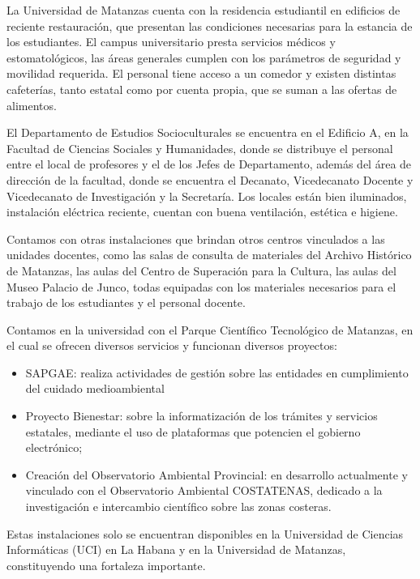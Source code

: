 La Universidad de Matanzas cuenta con la residencia estudiantil en edificios de reciente restauración, que presentan las condiciones necesarias para la estancia de los estudiantes. El campus universitario presta servicios médicos y estomatológicos, las áreas generales cumplen con los parámetros de seguridad y movilidad requerida. El personal tiene acceso a un comedor y existen distintas cafeterías, tanto estatal como por cuenta propia, que se suman a las ofertas de alimentos.

El Departamento de Estudios Socioculturales se encuentra en el Edificio A, en la Facultad de Ciencias Sociales y Humanidades, donde se distribuye el personal entre el local de profesores y el de los Jefes de Departamento, además del área de dirección de la facultad, donde se encuentra el Decanato, Vicedecanato Docente y Vicedecanato de Investigación y la Secretaría. Los locales están bien iluminados, instalación eléctrica reciente, cuentan con buena ventilación, estética e higiene.

Contamos con otras instalaciones que brindan otros centros vinculados a las unidades docentes, como las salas de consulta de materiales del Archivo Histórico de Matanzas, las aulas del Centro de Superación para la Cultura, las aulas del Museo Palacio de Junco, todas equipadas con los materiales necesarios para el trabajo de los estudiantes y el personal docente.

Contamos en la universidad con el Parque Científico Tecnológico de Matanzas, en el cual se ofrecen diversos servicios y funcionan diversos proyectos: 

\begin{itemize}
	\setlength\itemsep{-0.5em}
	\item SAPGAE: realiza actividades de gestión sobre las entidades en cumplimiento del cuidado medioambiental 
	\item Proyecto Bienestar: sobre la informatización de los trámites y servicios estatales, mediante el uso de plataformas que potencien el gobierno electrónico;
	\item Creación del Observatorio Ambiental Provincial: en desarrollo actualmente y vinculado con el Observatorio Ambiental COSTATENAS, dedicado a la investigación e intercambio científico sobre las zonas costeras.
\end{itemize}

Estas instalaciones solo se encuentran disponibles en la Universidad de Ciencias Informáticas (UCI) en La Habana y en la Universidad de Matanzas, constituyendo una fortaleza importante.\\

